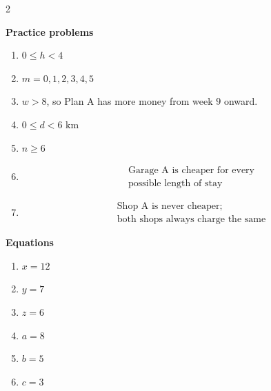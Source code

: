 \begin{multicols}{2}
\begin{enumerate}[label=\textbf{\arabic*.}]
			
		\end{enumerate}
		
		\newpage
		
		
		\textbf{Practice problems}
		
		\begin{enumerate}[label=\textbf{\arabic*.}]
			\item \(\boxed{0\leq h<4}\)
			
			\item \(\boxed{m=0,1,2,3,4,5}\)
			
			\item \(\boxed{w>8}\), so Plan A has more money from week \(9\) onward.
			
			\item \(\boxed{0\leq d<6\text{ km}}\)
			
			\item \(\boxed{n\geq 6}\)
			
			\item
			\[
			\boxed{
				\begin{aligned}
					&\text{Garage A is cheaper for every} \\
					&\text{possible length of stay}
				\end{aligned}
			}
			\]
			
			\item
			\[
			\boxed{
				\begin{aligned}
					&\text{Shop A is never cheaper;} \\
					&\text{both shops always charge the same}
				\end{aligned}
			}
			\]
			
		\end{enumerate}
		
		\textbf{Equations}
		
		\begin{enumerate}[label=\textbf{\arabic*.},start=8]
			\item \(\boxed{x=12}\)
			
			\item \(\boxed{y=7}\)
			
			\item \(\boxed{z=6}\)
			
			\item \(\boxed{a=8}\)
			
			\item \(\boxed{b=5}\)
			
			\item \(\boxed{c=3}\)
			

\end{enumerate}
\end{multicols}
